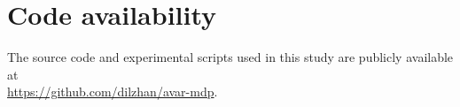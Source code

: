 \section*{Code availability}

The source code and experimental scripts used in this
study are publicly available at \\ \url{https://github.com/dilzhan/avar-mdp}.